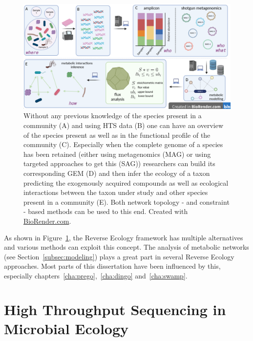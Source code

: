       \begin{figure}[!h]
         \centering
         \includegraphics[width=135mm]{figures/reverse_ecology.png}
         \caption[The \textit{Reverse Ecology} framework.]{Without any previous knowledge of the species present in a community (A) and using HTS data (B) one can have an overview of the species present 
         as well as in the functional profile of the community (C).
         Especially when the complete genome of a species has been retained (either using 
         metagenomics (MAG) or using targeted approaches to get this (SAG))
         researchers can build its corresponding GEM (D) and then 
         infer the ecology of a taxon predicting 
         the exogenously acquired compounds as well as ecological interactions between the taxon under study and other species present in a community (E). 
         Both network topology - and constraint - based methods can be used to this end.
         Created with \href{BioRender.com}{BioRender.com}.
         }
         \label{fig:revecol}
      \end{figure}

      As shown in Figure~\ref{fig:revecol}, the Reverse Ecology framework 
      has multiple alternatives and various methods can exploit this concept.
      The analysis of metabolic networks (see Section~\ref{subsec:modeling}) 
      plays a great part in several Reverse Ecology approaches.
      Most parts of this dissertation have been influenced by this, especially 
      chapters~\ref{cha:prego},~\ref{cha:dingo} and~\ref{cha:swamp}.
      



\section{High Throughput Sequencing in Microbial Ecology}

